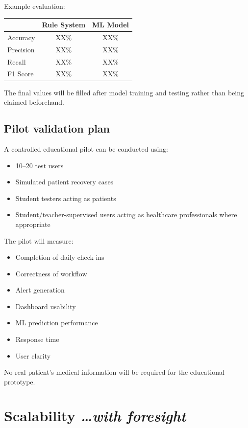 \documentclass[11pt,a4paper]{article}
\newcommand{\BvrHint}[1]{%
  {\normalfont\normalsize\itshape\hfill #1}}
\begin{document}
Example evaluation:

\begin{center}
\begin{tabular}{lcc}
\toprule
& \textbf{Rule System} & \textbf{ML Model} \\
\midrule
Accuracy & XX\% & XX\% \\
Precision & XX\% & XX\% \\
Recall & XX\% & XX\% \\
F1 Score & XX\% & XX\% \\
\bottomrule
\end{tabular}
\end{center}

The final values will be filled after model training and
testing rather than being claimed beforehand.

\subsection{Pilot validation plan}

A controlled educational pilot can be conducted using:
\begin{itemize}[leftmargin=0.7cm]
    \item 10--20 test users
    \item Simulated patient recovery cases
    \item Student testers acting as patients
    \item Student/teacher-supervised users acting as healthcare professionals where appropriate
\end{itemize}

The pilot will measure:
\begin{itemize}[leftmargin=0.7cm]
    \item Completion of daily check-ins
    \item Correctness of workflow
    \item Alert generation
    \item Dashboard usability
    \item ML prediction performance
    \item Response time
    \item User clarity
\end{itemize}

No real patient's medical information will be required for
the educational prototype.

\section{Scalability %
\BvrHint{\ldots with foresight}}
\end{document}
